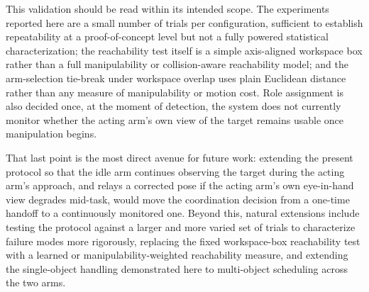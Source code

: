 \documentclass[letterpaper, 10 pt, conference]{ieeeconf}  %
\begin{document}
This validation should be read within its intended scope. The experiments reported here are a small number of trials per configuration, sufficient to establish repeatability at a proof-of-concept level but not a fully powered statistical characterization; the reachability test itself is a simple axis-aligned workspace box rather than a full manipulability or collision-aware reachability model; and the arm-selection tie-break under workspace overlap uses plain Euclidean distance rather than any measure of manipulability or motion cost. Role assignment is also decided once, at the moment of detection, the system does not currently monitor whether the acting arm's own view of the target remains usable once manipulation begins.

That last point is the most direct avenue for future work: extending the present protocol so that the idle arm continues observing the target during the acting arm's approach, and relays a corrected pose if the acting arm's own eye-in-hand view degrades
mid-task, would move the coordination decision from a one-time handoff to a continuously monitored one. Beyond this, natural extensions include testing the protocol against a larger and more varied set of trials to characterize failure modes more rigorously, replacing the fixed workspace-box reachability test with a learned or manipulability-weighted reachability measure, and extending the single-object handling demonstrated here to multi-object scheduling across the two arms.


\end{document}

